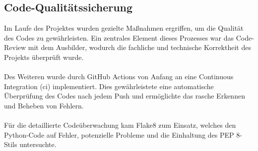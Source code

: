 \documentclass[a4paper,12pt]{article}
\begin{document}
\subsection{Code-Qualitätssicherung}
Im Laufe des Projektes wurden gezielte Maßnahmen ergriffen, um die Qualität des Codes zu gewährleisten. Ein zentrales Element dieses Prozesses war das Code-Review mit dem Ausbilder, wodurch die fachliche und technische Korrektheit des Projekts überprüft wurde.\\
\\
Des Weiteren wurde durch GitHub Actions von Anfang an eine Continuous Integration (\acrshort{ci}) implementiert. Dies gewährleistete eine automatische Überprüfung des Codes nach jedem Push und ermöglichte das rasche Erkennen und Beheben von Fehlern.\\
\\
Für die detaillierte Codeüberwachung kam Flake8 zum Einsatz, welches den Python-Code auf Fehler, potenzielle Probleme und die Einhaltung des PEP 8-Stils untersuchte.
\end{document}
